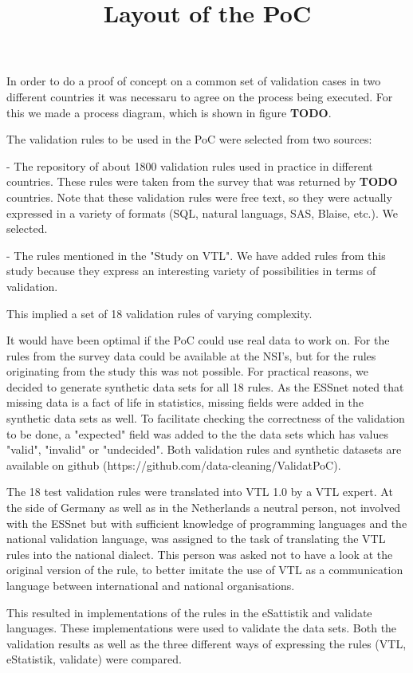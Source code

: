\title{Layout of the PoC}
In order to do a proof of concept on a common set of validation cases in two
different countries it was necessaru to agree on the process being executed.
For this we made a process diagram, which is shown in figure \textbf{TODO}.

The validation rules to be used in the PoC were selected from two sources:

 - The repository of about 1800 validation rules used in practice in different
   countries. These rules were taken from the survey that was returned by
\textbf{TODO} countries. Note that these validation rules were free text, so they were
actually expressed in a variety of formats (SQL, natural languags, SAS, Blaise,
etc.). We selected.
 
 - The rules mentioned in the "Study on VTL". We have added rules from this
   study because they express an interesting variety of possibilities in terms
of validation.
 
This implied a set of 18 validation rules of varying complexity.

It would have been optimal if the PoC could use real data to work on. For the
rules from the survey data could be available at the NSI's, but for the rules
originating from the study this was not possible. For practical reasons, we
decided to generate synthetic data sets for all 18 rules.  As the ESSnet noted
that missing data is a fact of life in statistics, missing fields were added in
the synthetic data sets as well.  To facilitate checking the correctness of the
validation to be done, a "expected" field was added to the the data sets which
has values "valid", "invalid" or "undecided".  Both validation rules and
synthetic datasets are available on github
(https://github.com/data-cleaning/ValidatPoC).

The 18 test validation rules were translated into VTL 1.0 by a VTL expert.  At
the side of Germany as well as in the Netherlands a neutral person, not
involved with the ESSnet but with sufficient knowledge of programming languages
and the national validation language, was assigned to the task of translating
the VTL rules into the national dialect.  This person was asked not to have a
look at the original version of the rule, to better imitate the use of VTL as a
communication language between international and national organisations.

This resulted in implementations of the rules in the eSattistik and validate
languages. These implementations were used to validate the data sets. Both the
validation results as well as the three different ways of expressing the rules
(VTL, eStatistik, validate) were compared.

